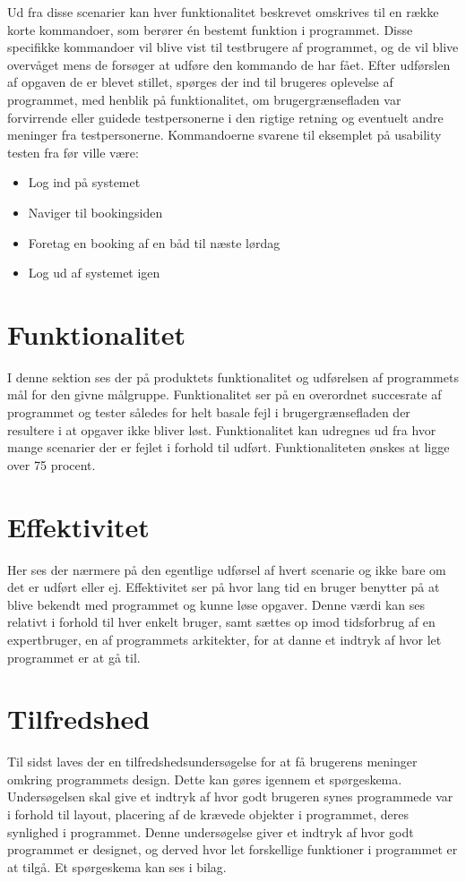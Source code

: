Ud fra disse scenarier kan hver funktionalitet beskrevet omskrives til en række korte kommandoer, som berører én bestemt funktion i programmet.
Disse specifikke kommandoer vil blive vist til testbrugere af programmet, og de vil blive overvåget mens de forsøger at udføre den kommando de har fået. Efter udførslen af opgaven de er blevet stillet, spørges der ind til brugeres oplevelse af programmet, med henblik på funktionalitet, om brugergrænsefladen var forvirrende eller guidede testpersonerne i den rigtige retning og eventuelt andre meninger fra testpersonerne.
Kommandoerne svarene til eksemplet på usability testen fra før ville være:
\begin{itemize}
\item Log ind på systemet
\item Naviger til bookingsiden
\item Foretag en booking af en båd til næste lørdag
\item Log ud af systemet igen
\end{itemize}
\section{Funktionalitet}
I denne sektion ses der på produktets funktionalitet og udførelsen af programmets mål for den givne målgruppe. Funktionalitet ser på en overordnet succesrate af programmet og tester således for helt basale fejl i brugergrænsefladen der resultere i at opgaver ikke bliver løst. Funktionalitet kan udregnes ud fra hvor mange scenarier der er fejlet i forhold til udført. Funktionaliteten ønskes at ligge over 75 procent. 
\section{Effektivitet}
Her ses der nærmere på den egentlige udførsel af hvert scenarie og ikke bare om det er udført eller ej. Effektivitet ser på hvor lang tid en bruger benytter på at blive bekendt med programmet og kunne løse opgaver. Denne værdi kan ses relativt i forhold til hver enkelt bruger, samt sættes op imod tidsforbrug af en expertbruger, en af programmets arkitekter, for at danne et indtryk af hvor let programmet er at gå til.
\section{Tilfredshed}
Til sidst laves der en tilfredshedsundersøgelse for at få brugerens meninger omkring programmets design. Dette kan gøres igennem et spørgeskema. Undersøgelsen skal give et indtryk af hvor godt brugeren synes programmede var i forhold til layout, placering af de krævede objekter i programmet, deres synlighed i programmet. Denne undersøgelse giver et indtryk af hvor godt programmet er designet, og derved hvor let forskellige funktioner i programmet er at tilgå. Et spørgeskema kan ses i bilag. 

\cbend